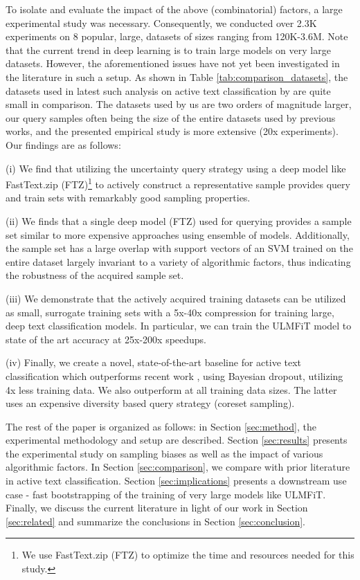 \documentclass[11pt,a4paper]{article}
\begin{document}
To isolate and evaluate the impact of the above (combinatorial) factors, a large experimental study was necessary. Consequently, we conducted over 2.3K experiments on 8 popular, large, datasets of sizes ranging from 120K-3.6M. Note that the current trend in deep learning is to train large models on very large datasets. However, the aforementioned issues have not yet been investigated in the literature in such a setup. As shown in Table \ref{tab:comparison_datasets}, the datasets used in latest such analysis on active text classification by \cite{siddhant2018deep} are quite small in comparison. The datasets used by us are two orders of magnitude larger, our query samples often being the size of the entire datasets used by previous works, and the presented empirical study is more extensive (20x experiments).
\\

\noindent Our findings are as follows:
 
 (i) We find that utilizing the uncertainty query strategy using a deep model like FastText.zip (FTZ)\footnote{We use FastText.zip (FTZ) to optimize the time and resources needed for this study.} to actively construct a representative sample provides query and train sets with remarkably good sampling properties. 
 
 (ii) We finds that a single deep model (FTZ) used for querying provides a sample set similar to more expensive approaches using ensemble of models. Additionally, the sample set has a large overlap with support vectors of an SVM trained on the entire dataset largely invariant to a variety of algorithmic factors, thus indicating the robustness of the acquired sample set.   
 
(iii) We demonstrate that the actively acquired training datasets can be utilized as small, surrogate training sets with a 5x-40x compression for training large, deep text classification models. In particular, we can train the ULMFiT \cite{howard2018universal} model to state of the art accuracy at 25x-200x speedups.

(iv) Finally, we create a novel, state-of-the-art baseline for active text classification which outperforms recent work \cite{siddhant2018deep}, using Bayesian dropout, utilizing 4x less training data. We also outperform \cite{sener2018active}  at all training data sizes. The latter uses an expensive diversity based query strategy (coreset sampling). 

The rest of the paper is organized as follows: in Section \ref{sec:method}, the experimental methodology and setup are described. Section \ref{sec:results} presents the experimental study on sampling biases as well as the impact of various algorithmic factors. In Section \ref{sec:comparison}, we compare with prior literature in active text classification. Section \ref{sec:implications} presents a downstream use case - fast bootstrapping of the training of very large models like ULMFiT. Finally, we discuss the current literature in light of our work in Section \ref{sec:related} and summarize the conclusions in Section \ref{sec:conclusion}.
 
\end{document}
